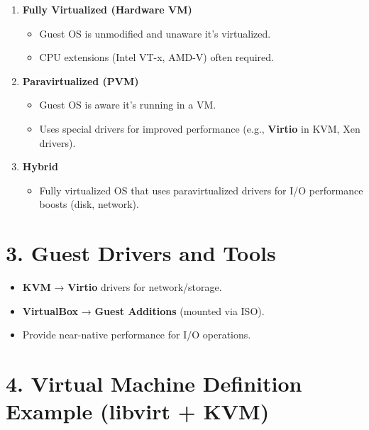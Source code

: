\documentclass[a4paper]{report}
\begin{document}
\begin{enumerate}
    \item \textbf{Fully Virtualized (Hardware VM)}
    \begin{itemize}
        \item Guest OS is unmodified and unaware it’s virtualized.
        \item CPU extensions (Intel VT-x, AMD-V) often required.
    \end{itemize}

    \item \textbf{Paravirtualized (PVM)}
    \begin{itemize}
        \item Guest OS is aware it’s running in a VM.
        \item Uses special drivers for improved performance (e.g., \textbf{Virtio} in KVM, Xen drivers).
    \end{itemize}

    \item \textbf{Hybrid}
    \begin{itemize}
        \item Fully virtualized OS that uses paravirtualized drivers for I/O performance boosts (disk, network).
    \end{itemize}
\end{enumerate}

\section*{3. Guest Drivers and Tools}

\begin{itemize}
    \item \textbf{KVM} → \textbf{Virtio} drivers for network/storage.
    \item \textbf{VirtualBox} → \textbf{Guest Additions} (mounted via ISO).
    \item Provide near-native performance for I/O operations.
\end{itemize}

\section*{4. Virtual Machine Definition Example (libvirt + KVM)}
\end{document}
